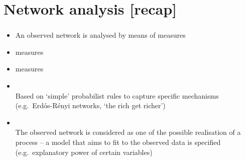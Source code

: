\documentclass[8pt]{beamer}
\begin{document}
\begin{frame}
\frametitle{\insertsection}
\tableofcontents[hideallsubsections]
\end{frame}







\section{Network analysis [recap]}

\bgroup
{}
\begin{frame}[plain]{}
\begin{center}
\color{white}{\Huge\insertsection}
\end{center}
\end{frame}
\egroup



\begin{frame}
\frametitle{\insertsection}

{\color{blue}{Descriptive network analysis}}
    \begin{itemize}
    \item An observed network is analysed by means of measures
    \item {\color{blue}{Network-level}} measures
    \item {\color{blue}{Node-level}} measures
    \end{itemize}

\bigskip
	
{\color{blue}{Modelling and inference of networks}}
    \begin{itemize}
    \item {\color{blue}{Mathematical models}}\\
    Based on `simple' probabilist rules to capture specific mechanisms (e.g.\ Erd\'os-R\'enyi networks, `the rich get richer')		
    \item {\color{blue}{Statistical models}}\\ 
    The observed network is considered as one of the possible realisation of a process -- a model that aims to fit to the observed data is specified (e.g.\ explanatory power of certain variables)
    \end{itemize}


\end{frame}
\end{document}
